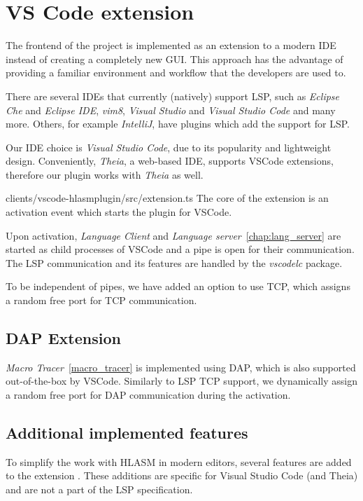 \chapter{VS Code extension}
\label{extension}
The frontend of the project is implemented as an extension to a modern IDE instead of creating a completely new GUI. This approach has the advantage of providing a familiar environment and workflow that the developers are used to.

There are several IDEs that currently (natively) support LSP, such as \emph{Eclipse Che} and \emph{Eclipse IDE}, \emph{vim8}, \emph{Visual Studio} and \emph{Visual Studio Code} and many more. Others, for example \emph{IntelliJ}, have plugins which add the support for LSP.

Our IDE choice is \emph{Visual Studio Code}, due to its popularity and lightweight design. Conveniently, \emph{Theia}, a web-based IDE, supports VSCode extensions, therefore our plugin works with \emph{Theia} as well.

{clients/vscode-hlasmplugin/src/extension.ts}
The core of the extension is an activation event which starts the plugin for VSCode.

Upon activation, \emph{Language Client} and \emph{Language server}~\ref{chap:lang_server} are started as child processes of VSCode and a pipe is open for their communication. The LSP communication and its features are handled by the \emph{vscodelc} package. 

To be independent of pipes, we have added an option to use TCP, which assigns a random free port for TCP communication.

\section{DAP Extension}

\emph{Macro Tracer}~\ref{macro_tracer} is implemented using DAP, which is also supported out-of-the-box by VSCode. Similarly to LSP TCP support, we dynamically assign a random free port for DAP communication during the activation.

\section{Additional implemented features}

To simplify the work with HLASM in modern editors, several features are added to the extension . These additions are specific for Visual Studio Code (and Theia) and are not a part of the LSP specification.

